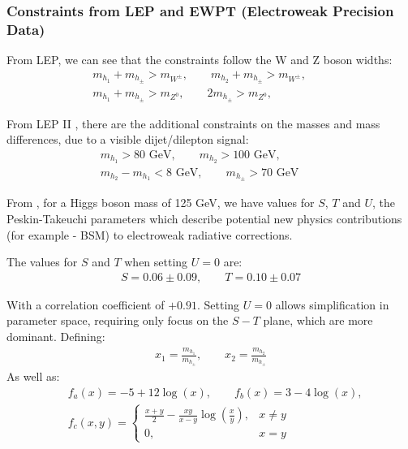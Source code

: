 \documentclass[12pt]{article}
\begin{document}
\subsubsection{Constraints from LEP and EWPT (Electroweak Precision Data)}
From LEP, we can see that the constraints follow the W and Z boson widths:
\begin{align}
    m_{h_1} + m_{h_\pm} > m_{W^\pm}, \qquad
    m_{h_2} + m_{h_\pm} > m_{W^\pm}, \qquad  \label{LEP2_1}
    \\
    m_{h_1} + m_{h_\pm} > m_{Z^0}, \qquad
    2m_{h_\pm} > m_{Z^0}, \qquad  \label{LEP2_2}
\end{align}

From LEP II \cite{Lundstr_m_2009}, there are the additional constraints on the masses and mass differences, due to a visible dijet/dilepton signal:
\begin{align}
    m_{h_1}> 80 \text{ GeV}, \qquad
    m_{h_2}> 100 \text{ GeV}, \qquad \label{LEP2_3}
    \\
    m_{h_2} - m_{h_1} < 8\text{ GeV}, \qquad
    m_{h_\pm}> 70\text{ GeV} \qquad \label{LEP2_4}
\end{align}

From \cite{gfitter2014global}, for a Higgs boson mass of 125 GeV, we have values for $S$, $T$ and $U$, the Peskin-Takeuchi parameters \cite{PeskinTakeuchi1990} which describe potential new physics contributions (for example - BSM) to electroweak radiative corrections.

 The values for $S$ and $T$ when setting $U = 0$ are:
 \begin{align}
     S = 0.06 \pm0.09, \qquad
     T = 0.10\pm0.07
 \end{align}

With a correlation coefficient of $+0.91$. Setting $U = 0$ allows simplification in parameter space, requiring only focus on the $S-T$ plane, which are more dominant. Defining:
\begin{align}
    x_1 = \frac{m_{h_1}}{m_{h_\pm}}, \qquad 
    x_2 = \frac{m_{h_2}}{m_{h_\pm}}
\end{align}
As well as:
\begin{align}
    &f_a(x) = -5 +12\log(x), \qquad
    f_b(x) = 3-4\log(x),
    \\
    &f_c(x,y) = 
    \begin{cases}
        \frac{x+y}{2}-\frac{xy}{x-y}\log{\left(\frac{x}{y}\right)}, & x\neq y\\
        0, & x = y
    \end{cases}
\end{align}
\end{document}
